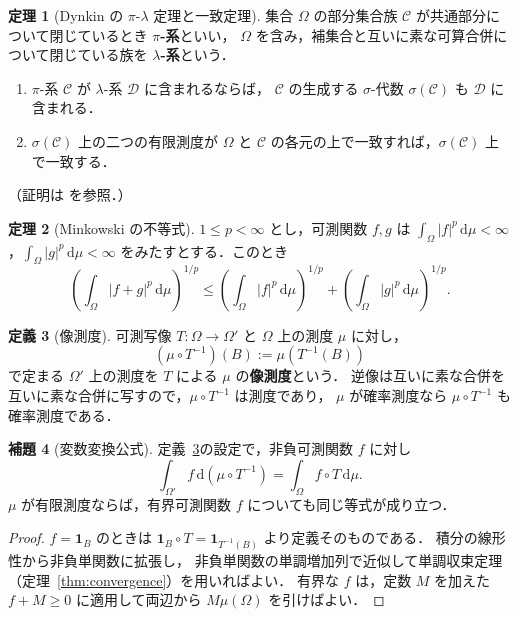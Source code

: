 \documentclass[12pt,a4j,twoside]{jreport}
\numberwithin{equation}{chapter}
\theoremstyle{definition} %
\newtheorem{thm}{定理}[chapter]
\newtheorem{lem}[thm]{補題}
\newtheorem{dfn}[thm]{定義}
\newcommand{\abs}[1]{\lvert #1\rvert}
\renewcommand{\d}{\mathrm{d}} %
\begin{document}
\begin{thm}[Dynkin の $\pi$-$\lambda$ 定理と一致定理]\label{thm:dynkin}
  集合 $\Omega$ の部分集合族 $\mathcal{C}$ が共通部分について閉じているとき
  \textbf{$\pi$-系}といい，
  $\Omega$ を含み，補集合と互いに素な可算合併について閉じている族を
  \textbf{$\lambda$-系}という．
  \begin{enumerate}
    \item $\pi$-系 $\mathcal{C}$ が $\lambda$-系 $\mathcal{D}$ に含まれるならば，
      $\mathcal{C}$ の生成する $\sigma$-代数 $\sigma(\mathcal{C})$ も $\mathcal{D}$ に含まれる．
    \item $\sigma(\mathcal{C})$ 上の二つの有限測度が $\Omega$ と
      $\mathcal{C}$ の各元の上で一致すれば，$\sigma(\mathcal{C})$ 上で一致する．
  \end{enumerate}
  （証明は \cite{Dudley} を参照．）
\end{thm}

\begin{thm}[Minkowski の不等式]\label{thm:minkowski}
  $1\leq p<\infty$ とし，可測関数 $f,g$ は
  $\int_\Omega\abs{f}^p\,\d\mu<\infty$，$\int_\Omega\abs{g}^p\,\d\mu<\infty$ をみたすとする．このとき
  \[
    \left(\int_\Omega\abs{f+g}^p\,\d\mu\right)^{1/p}
    \leq
    \left(\int_\Omega\abs{f}^p\,\d\mu\right)^{1/p}
    +\left(\int_\Omega\abs{g}^p\,\d\mu\right)^{1/p}.
  \]
\end{thm}

\begin{dfn}[像測度]\label{dfn:pushforward}
  可測写像 $T\colon\Omega\to\Omega'$ と $\Omega$ 上の測度 $\mu$ に対し，
  \[
    (\mu\circ T^{-1})(B):=\mu(T^{-1}(B))
  \]
  で定まる $\Omega'$ 上の測度を $T$ による $\mu$ の\textbf{像測度}という．
  逆像は互いに素な合併を互いに素な合併に写すので，$\mu\circ T^{-1}$ は測度であり，
  $\mu$ が確率測度なら $\mu\circ T^{-1}$ も確率測度である．
\end{dfn}

\begin{lem}[変数変換公式]\label{lem:change-of-variables}
  定義~\ref{dfn:pushforward}の設定で，非負可測関数 $f$ に対し
  \[
    \int_{\Omega'}f\,\d(\mu\circ T^{-1})=\int_\Omega f\circ T\,\d\mu.
  \]
  $\mu$ が有限測度ならば，有界可測関数 $f$ についても同じ等式が成り立つ．
\end{lem}

\begin{proof}
  $f=\mathbf{1}_B$ のときは $\mathbf{1}_B\circ T=\mathbf{1}_{T^{-1}(B)}$ より定義そのものである．
  積分の線形性から非負単関数に拡張し，
  非負単関数の単調増加列で近似して単調収束定理（定理~\ref{thm:convergence}）を用いればよい．
  有界な $f$ は，定数 $M$ を加えた $f+M\geq0$ に適用して両辺から $M\mu(\Omega)$ を引けばよい．
\end{proof}
\end{document}

